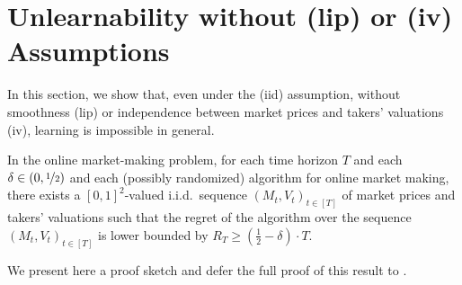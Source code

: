 \documentclass[final,12pt]{colt2025}
\newcommand{\lrb}[1]{\left(#1\right)}
\newcommand{\nP}{M}
\newcommand{\nZ}{V}
\begin{document}











\section{Unlearnability without (lip) or (iv) Assumptions}
%

In this section, we show that, even under the (iid) assumption, without smoothness (lip) or independence between market prices and takers' valuations (iv), learning is impossible in general.

\begin{theorem}\label{t:minimal-lower-bound-iid}
In the online market-making problem, 
for each time horizon $T$ and each $\delta \in (0, \nicefrac{1}{2})$ and each (possibly randomized) algorithm for online market making, there exists a $[0,1]^2$-valued i.i.d.\ sequence $(\nP_t,\nZ_t)_{t \in [T]}$ of market prices and takers' valuations such that the regret of the algorithm over the sequence $(\nP_t,\nZ_t)_{t \in [T]}$ is lower bounded by
$
    R_T \ge \lrb{\frac{1}{2} - \delta} \cdot T
$.
\end{theorem}

We present here a proof sketch and defer the full proof of this result to .
\end{document}
